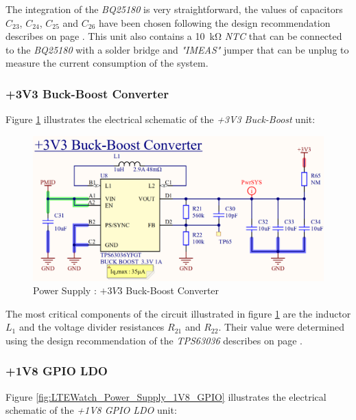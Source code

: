 \documentclass[report.tex]{subfiles}
\begin{document}
The integration of the \textit{BQ25180} is very straightforward, the values of capacitors $C_{23}$, $C_{24}$, $C_{25}$ and $C_{26}$ have been chosen following the design recommendation describes on page \pageref{sec:bat_chrg_sel}. This unit also contains a \SI{10}{\kilo\ohm} \textit{NTC} that can be connected to the \textit{BQ25180} with a solder bridge and \textit{"IMEAS"} jumper that can be unplug to measure the current consumption of the system.

\subsubsection{+3V3 Buck-Boost Converter}

Figure \ref{fig:LTEWatch_Power_Supply_3V3_Buck_Boost} illustrates the electrical schematic of the \textit{+3V3 Buck-Boost} unit:

\begin{figure}[H]
	\centering
	\includegraphics[width=1\textwidth]{Include/Figure/Hardware/LTEWatch_Power_Supply_3V3_Buck-Boost}
	\caption{Power Supply : $+3V3$ Buck-Boost Converter}
	\label{fig:LTEWatch_Power_Supply_3V3_Buck_Boost}
\end{figure}

The most critical components of the circuit illustrated in figure \ref{fig:LTEWatch_Power_Supply_3V3_Buck_Boost} are the inductor $L_1$ and the voltage divider resistances $R_{21}$ and $R_{22}$. Their value were determined using the design recommendation of the \textit{TPS63036} describes on page \pageref{sec:bck_bst_sel}.

\subsubsection{+1V8 GPIO LDO}

Figure \ref{fig:LTEWatch_Power_Supply_1V8_GPIO} illustrates the electrical schematic of the \textit{+1V8 GPIO LDO} unit:
\end{document}
